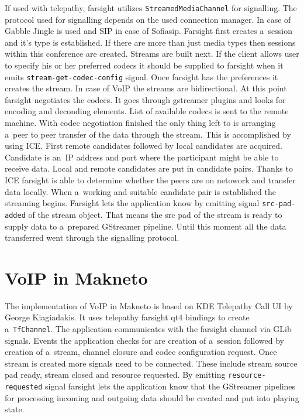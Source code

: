 If used with telepathy, farsight utilizes \verb|StreamedMediaChannel| for signalling. The protocol used for signalling depends on the used connection manager. In case of Gabble Jingle is used and SIP in case of Sofiasip. Farsight first creates a~session and it's type is established. If there are more than just media types then sessions within this conference are created. Streams are built next. If the client allows user to specify his or her preferred codecs it should be supplied to farsight when it emits \verb|stream-get-codec-config| signal. Once farsight has the preferences it creates the stream. In case of VoIP the streams are bidirectional. At this point farsight negotiates the codecs. It goes through gstreamer plugins and looks for encoding and deconding elements. List of available codecs is sent to the remote machine. With codec negotiation finished the only thing left to is arranging a~peer to peer transfer of the data through the stream. This is accomplished by using ICE. First remote candidates followed by local candidates are acquired. Candidate is an~IP address and port where the participant might be able to receive data. Local and remote candidates are put in candidate pairs. Thanks to ICE farsight is able to determine whether the peers are on netowork and transfer data locally. When a~working and suitable candidate pair is established the streaming begins. Farsight lets the application know by emitting signal \verb|src-pad-added| of the stream object. That means the src pad of the stream is ready to supply data to a~prepared GStreamer pipeline. Until this moment all the data transferred went through the signalling protocol. 


\section{VoIP in Makneto}
The implementation of VoIP in Makneto is based on KDE Telepathy Call UI \cite{kdeTpCallUI} by George Kiagiadakis. It uses telepathy farsight qt4 bindings to create a~\verb|TfChannel|. The application communicates with the farsight channel via GLib signals. Events the application checks for are creation of a~session followed by creation of a~stream, channel closure and codec configuration request. Once stream is created more signals need to be connected. These include stream source pad ready, stream closed and resource requested. By emitting \verb|resource-requested| signal farsight lets the application know that the GStreamer pipelines for processing incoming and outgoing data should be created and put into playing state. 

